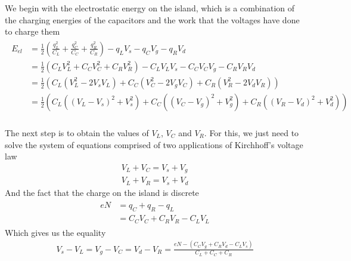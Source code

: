 \documentclass[../main.tex]{subfiles}
\begin{document}
We begin with the electrostatic energy on the island, which is a combination
of the charging energies of the capacitors and the work that the voltages have
done to charge them
\begin{align*}
\begin{split}
\label{eq:InitialElecESET}
E_{el} &= \frac{1}{2}\left(\frac{q^{2}_{L}}{C_{L}} +
                           \frac{q^{2}_{C}}{C_{C}} +
                           \frac{q^{2}_{R}}{C_{R}}\right)
          - q_{L}V_{s}
          - q_{C}V_{g}
          - q_{R}V_{d}\\
       &= \frac{1}{2}\left(C_{L}V_{L}^2 +
                           C_{C}V_{C}^2 +
                           C_{R}V_{R}^2\right)
          - C_{L}V_{L}V_{s}
          - C_{C}V_{C}V_{g}
          - C_{R}V_{R}V_{d}\\
       &= \frac{1}{2}\left(C_{L}(V^2_{L} - 2V_{s}V_{L}) +
                           C_{C}(V^2_{C} - 2V_{g}V_{C}) +
                           C_{R}(V^2_{R} - 2V_{d}V_{R})\right)\\
       &= \frac{1}{2}\left(C_{L}((V_{L} - V_{s})^2 + V_{s}^2) +
                           C_{C}((V_{C} - V_{g})^2 + V_{g}^2) +
                           C_{R}((V_{R} - V_{d})^2 + V_{d}^2)\right)\\
\end{split}
\end{align*}

The next step is to obtain the values of \(V_{L}\), \(V_{C}\) and \(V_{R}\).
For this, we just need to solve the system of equations comprised of two
applications of Kirchhoff's voltage law
\begin{align*}
    V_{L} + V_{C} = V_{s} + V_{g}\\
    V_{L} + V_{R} = V_{s} + V_{d}
\end{align*}
And the fact that the charge on the island is discrete
\begin{align*}
\begin{split}
    eN &= q_{C} + q_{R} - q_{L}\\
       &= C_{C}V_{C} + C_{R}V_{R} - C_{L}V_{L}
\end{split}
\end{align*}
Which gives us the equality
\begin{align*}
    V_{s} - V_{L} = V_{g} - V_{C}
                  = V_{d} - V_{R}
                  = \frac{eN - (C_{C}V_{g} + C_{R}V_{d} - C_{L}V_{s})}{C_{L} + C_{C} + C_{R}}
\end{align*}
\end{document}
